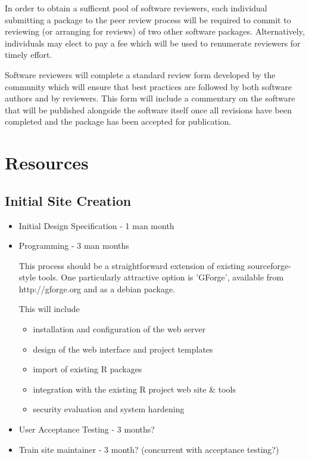 \documentclass[12pt]{article}
\begin{document}
In order to obtain a sufficent pool of software reviewers, each
individual submitting a package to the peer review process will be
required to commit to reviewing (or arranging for reviews) of two
other software packages.  Alternatively, individuals may elect to pay
a fee which will be used to renumerate reviewers for timely effort.

Software reviewers will complete a standard review form developed by
the community which will ensure that best practices are followed by
both software authors and by reviewers.  This form will include a
commentary on the software that will be published alongside the
software itself once all revisions have been completed and the package
has been accepted for publication. 

\section{Resources}

\subsection{Initial Site Creation}

\begin{itemize}
\item Initial Design Specification - 1 man month

\item Programming - 3 man months
  
  This process should be a straightforward extension of existing
  sourceforge-style tools.  One particularly attractive option is
  'GForge', available from http://gforge.org and as a debian package.

  This will include 
  \begin{itemize}
  \item installation and configuration of the web server
  \item design of the web interface and project templates
  \item import of existing R packages
  \item integration with the existing R project web site \& tools
  \item security evaluation and system hardening
  \end{itemize}
    
\item User Acceptance Testing - 3 months?

\item Train site maintainer - 3 month?  (concurrent with acceptance testing?)

\end{itemize}
\end{document}

